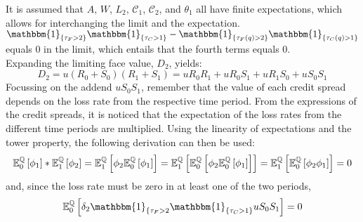\documentclass[main.tex]{subfiles}
\begin{document}
        It is assumed that $A$, $W$, $L_{2}$, $\mathcal{C}_1$, $\mathcal{C}_2$, and $\theta_1$ all have finite expectations,
        which allows for interchanging the limit and the expectation.
        $\mathbbm{1}_{\{\tau_{F}>2\}} \mathbbm{1}_{\{\tau_{C}>1\}} - \mathbbm{1}_{\{\tau_{F}(q)>2\}} \mathbbm{1}_{\{\tau_{C}(q)>1\}}$ equals 0 in the limit,
        which entails that the fourth terms equals 0.
        \\
        Expanding the limiting face value, $D_{2}$, yields:
        \begin{equation}
            D_2 = u(R_0 + S_0)(R_1 + S_1) = u R_0 R_1 + u R_0 S_1 + u R_1 S_0 + u S_0 S_1
        \end{equation}
        Focussing on the addend $u S_0 S_1$, remember that the value of each credit spread depends on the loss rate from the respective time period.
        From the expressions of the credit spreads, it is noticed that the expectation of the loss rates from the different time periods are multiplied.
        Using the linearity of expectations and the tower property, the following derivation can then be used:
        \begin{equation*}
            \mathbb{E}_{0}^{\mathbb{Q}}\left[\phi_1\right]
            * \mathbb{E}_{1}^{\mathbb{Q}}\left[\phi_2\right]
            = \mathbb{E}_{1}^{\mathbb{Q}}\left[
                \phi_2 \mathbb{E}_{0}^{\mathbb{Q}}\left[\phi_1\right]
            \right] 
            = \mathbb{E}_{1}^{\mathbb{Q}}\left[
                \mathbb{E}_{0}^{\mathbb{Q}}\left[
                    \phi_2
                    \mathbb{E}_{0}^{\mathbb{Q}}\left[
                        \phi_1
                    \right]
                \right]
            \right]
            = \mathbb{E}_{1}^{\mathbb{Q}}\left[
                \mathbb{E}_{0}^{\mathbb{Q}}\left[
                    \phi_2 \phi_1
                \right]
            \right]
            = 0
        \end{equation*}
        and, since the loss rate must be zero in at least one of the two periods,
        \begin{equation}
            \mathbb{E}_{0}^{\rnmeasure}\left[\delta_2\mathbbm{1}_{\{\tau_{F}>2} \mathbbm{1}_{\{\tau_{C}>1\}}u S_0 S_1\right] = 0
        \end{equation}
        
\end{document}
